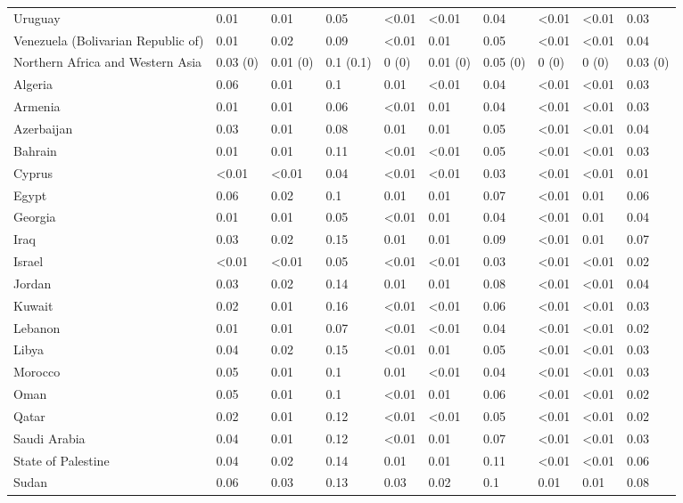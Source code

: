 \begin{longtable}[t]{llllllllll}
Uruguay & 0.01 & 0.01 & 0.05 & <0.01 & <0.01 & 0.04 & <0.01 & <0.01 & 0.03\\
Venezuela (Bolivarian Republic of) & 0.01 & 0.02 & 0.09 & <0.01 & 0.01 & 0.05 & <0.01 & <0.01 & 0.04\\
\addlinespace
Northern Africa and Western Asia & 0.03 (0) & 0.01 (0) & 0.1 (0.1) & 0 (0) & 0.01 (0) & 0.05 (0) & 0 (0) & 0 (0) & 0.03 (0)\\
Algeria & 0.06 & 0.01 & 0.1 & 0.01 & <0.01 & 0.04 & <0.01 & <0.01 & 0.03\\
Armenia & 0.01 & 0.01 & 0.06 & <0.01 & 0.01 & 0.04 & <0.01 & <0.01 & 0.03\\
Azerbaijan & 0.03 & 0.01 & 0.08 & 0.01 & 0.01 & 0.05 & <0.01 & <0.01 & 0.04\\
Bahrain & 0.01 & 0.01 & 0.11 & <0.01 & <0.01 & 0.05 & <0.01 & <0.01 & 0.03\\
\addlinespace
Cyprus & <0.01 & <0.01 & 0.04 & <0.01 & <0.01 & 0.03 & <0.01 & <0.01 & 0.01\\
Egypt & 0.06 & 0.02 & 0.1 & 0.01 & 0.01 & 0.07 & <0.01 & 0.01 & 0.06\\
Georgia & 0.01 & 0.01 & 0.05 & <0.01 & 0.01 & 0.04 & <0.01 & 0.01 & 0.04\\
Iraq & 0.03 & 0.02 & 0.15 & 0.01 & 0.01 & 0.09 & <0.01 & 0.01 & 0.07\\
Israel & <0.01 & <0.01 & 0.05 & <0.01 & <0.01 & 0.03 & <0.01 & <0.01 & 0.02\\
\addlinespace
Jordan & 0.03 & 0.02 & 0.14 & 0.01 & 0.01 & 0.08 & <0.01 & <0.01 & 0.04\\
Kuwait & 0.02 & 0.01 & 0.16 & <0.01 & <0.01 & 0.06 & <0.01 & <0.01 & 0.03\\
Lebanon & 0.01 & 0.01 & 0.07 & <0.01 & <0.01 & 0.04 & <0.01 & <0.01 & 0.02\\
Libya & 0.04 & 0.02 & 0.15 & <0.01 & 0.01 & 0.05 & <0.01 & <0.01 & 0.03\\
Morocco & 0.05 & 0.01 & 0.1 & 0.01 & <0.01 & 0.04 & <0.01 & <0.01 & 0.03\\
\addlinespace
Oman & 0.05 & 0.01 & 0.1 & <0.01 & 0.01 & 0.06 & <0.01 & <0.01 & 0.02\\
Qatar & 0.02 & 0.01 & 0.12 & <0.01 & <0.01 & 0.05 & <0.01 & <0.01 & 0.02\\
Saudi Arabia & 0.04 & 0.01 & 0.12 & <0.01 & 0.01 & 0.07 & <0.01 & <0.01 & 0.03\\
State of Palestine & 0.04 & 0.02 & 0.14 & 0.01 & 0.01 & 0.11 & <0.01 & <0.01 & 0.06\\
Sudan & 0.06 & 0.03 & 0.13 & 0.03 & 0.02 & 0.1 & 0.01 & 0.01 & 0.08\\

\end{longtable}
